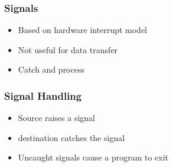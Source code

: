 \documentclass[pdftex]{beamer} %
\begin{document}
\begin{frame}
  \frametitle{Signals}
  \begin{itemize}
  \item Based on hardware interrupt model
  \item Not useful for data transfer
  \item Catch and process
  \end{itemize}
\end{frame}

\begin{frame}
  \frametitle{Signal Handling}
  \begin{itemize}
  \item Source raises a signal
  \item destination catches the signal 
  \item Uncaught signals cause a program to exit
  \end{itemize}
\end{frame}
\end{document}
